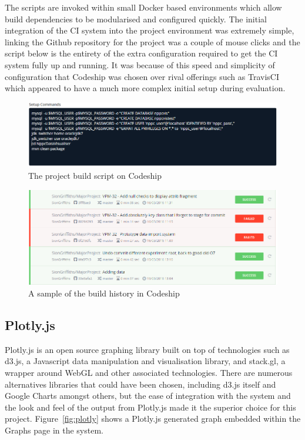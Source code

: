  The scripts are invoked within small Docker \cite{docker} based environments which allow build dependencies to be modularised and configured quickly. The initial integration of the CI system into the project environment was extremely simple, linking the Github repository for the project was a couple of mouse clicks and the script below is the entirety of the extra configuration required to get the CI system fully up and running. It was because of this speed and simplicity of configuration that Codeship was chosen over rival offerings such as TravisCI \cite{travis} which appeared to have a much more complex initial setup during evaluation.

\begin{figure}[H]
    \centering
    \includegraphics[width=\textwidth]{images/tools/codeShipScript}
    \caption{The project build script on Codeship}
    \label{fig:build_script}
\end{figure} 

\begin{figure}[H]
    \centering
    \includegraphics[width=\textwidth]{images/tools/codeShipSmall}
    \caption{A sample of the build history in Codeship}
    \label{fig:build_history}
\end{figure} 



\subsection{Plotly.js}

Plotly.js\cite{_plotly} is an open source graphing library built on top of technologies such as d3.js, a Javascript data manipulation and visualisation library, and stack.gl, a wrapper around WebGL and other associated technologies. There are numerous alternatives libraries that could have been chosen, including d3.js itself and Google Charts amongst others, but the ease of integration with the system and the look and feel of the output from Plotly.js made it the superior choice for this project. Figure~\ref{fig:plotly} shows a Plotly.js generated graph embedded within the Graphs page in the system.


